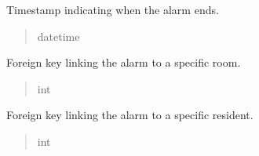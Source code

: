 \documentclass[letterpaper,10pt,english]{sphinxmanual}
\begin{document}
\begin{fulllineitems}
\begin{fulllineitems}
\label{\detokenize{app.mysql:app.mysql.alarm.Alarm.end}}
\pysigstartsignatures
\pysigline
{}
\pysigstopsignatures
\sphinxAtStartPar
Timestamp indicating when the alarm ends.
\begin{quote}\begin{description}
\sphinxAtStartPar
datetime

\end{description}\end{quote}

\end{fulllineitems}


\begin{fulllineitems}
\label{\detokenize{app.mysql:app.mysql.alarm.Alarm.idRoom}}
\pysigstartsignatures
\pysigline
{}
\pysigstopsignatures
\sphinxAtStartPar
Foreign key linking the alarm to a specific room.
\begin{quote}\begin{description}
\sphinxAtStartPar
int

\end{description}\end{quote}

\end{fulllineitems}


\begin{fulllineitems}
\label{\detokenize{app.mysql:app.mysql.alarm.Alarm.idResident}}
\pysigstartsignatures
\pysigline
{}
\pysigstopsignatures
\sphinxAtStartPar
Foreign key linking the alarm to a specific resident.
\begin{quote}\begin{description}
\sphinxAtStartPar
int

\end{description}\end{quote}

\end{fulllineitems}



\end{fulllineitems}
\end{document}
